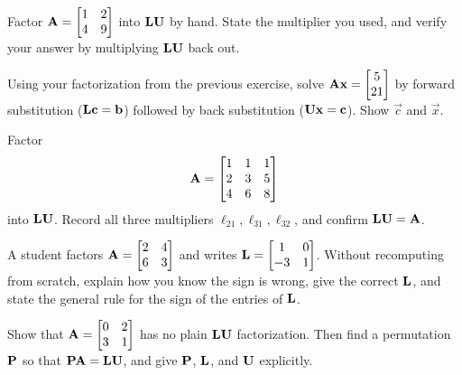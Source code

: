 \begin{exercise}
\label{ch09:ex-warmup}
Factor $\mathbf{A}=\begin{bmatrix} 1 & 2 \\ 4 & 9 \end{bmatrix}$ into $\mathbf{L}\mathbf{U}$ by hand.
State the multiplier you used, and verify your answer by multiplying $\mathbf{L}\mathbf{U}$ back
out.
\end{exercise}

\begin{exercise}
\label{ch09:ex-twoslides}
Using your factorization from the previous exercise, solve $\mathbf{A}\mathbf{x}=\begin{bmatrix}5\\21\end{bmatrix}$ by
forward substitution ($\mathbf{L}\mathbf{c}=\mathbf{b}$) followed by back substitution
($\mathbf{U}\mathbf{x}=\mathbf{c}$). Show $\vec{c}$ and $\vec{x}$.
\end{exercise}

\begin{exercise}
\label{ch09:ex-3x3}
Factor
\[
  \mathbf{A} = \begin{bmatrix} 1 & 1 & 1 \\ 2 & 3 & 5 \\ 4 & 6 & 8 \end{bmatrix}
\]
into $\mathbf{L}\mathbf{U}$. Record all three multipliers $\ell_{21},\ell_{31},\ell_{32}$, and
confirm $\mathbf{L}\mathbf{U}=\mathbf{A}$.
\end{exercise}

\begin{exercise}
\label{ch09:ex-signs}
A student factors $\mathbf{A}=\begin{bmatrix}2&4\\6&3\end{bmatrix}$ and writes
$\mathbf{L}=\begin{bmatrix}1&0\\-3&1\end{bmatrix}$. Without recomputing from scratch, explain
how you know the sign is wrong, give the correct $\mathbf{L}$, and state the general rule for the
sign of the entries of $\mathbf{L}$.
\end{exercise}

\begin{exercise}
\label{ch09:ex-perm}
Show that $\mathbf{A}=\begin{bmatrix} 0 & 2 \\ 3 & 1 \end{bmatrix}$ has no plain $\mathbf{L}\mathbf{U}$
factorization. Then find a permutation $\mathbf{P}$ so that $\mathbf{P}\mathbf{A}=\mathbf{L}\mathbf{U}$, and
give $\mathbf{P}$, $\mathbf{L}$, and $\mathbf{U}$ explicitly.
\end{exercise}

